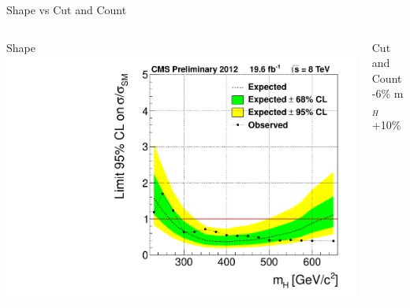 \begin{frame}{Shape vs Cut and Count}
\begin{center}
\scriptsize
\begin{columns}
  \begin{column}{0.5\textwidth}
    \begin{center}
    {\large Shape}\\ 
    \vspace{.2em}
   \includegraphics[width=1.\textwidth]{images/8TeV_limit.pdf}
   \end{center}
  \end{column}
  \begin{column}{0.5\textwidth}
    \begin{center}
    {\large Cut and Count}\\
    -6\% m$_H$ +10\%\\
    \vspace{.2em}

\end{center}
\end{column}
\end{columns}
\end{center}
\end{frame}

